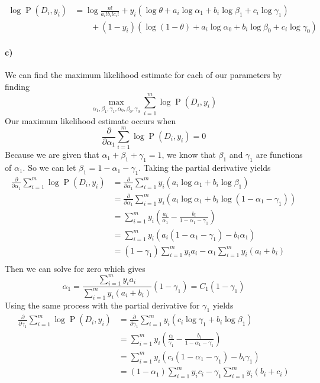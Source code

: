 \documentclass[12pt]{article}
\begin{document}
\begin{align*}
        \log \operatorname{P}(D_i, y_i) &= \log \frac{n!}{a_i!b_i!c_i!} + y_i(\log \theta +a_i\log\alpha_1+b_i\log\beta_1+c_i\log\gamma_1)\\
        &\qquad+(1-y_i)(\log(1-\theta)+a_i\log\alpha_0+b_i\log\beta_0+c_i\log\gamma_0)
\end{align*}

\paragraph{c)}

We can find the maximum likelihood estimate for each of our parameters by finding
\[\max_{\alpha_1,\beta_1,\gamma_1,\alpha_0,\beta_0,\gamma_0}\sum_{i=1}^m\log \operatorname{P}(D_i, y_i)\]
Our maximum likelihood estimate occurs when
\[\frac{\partial}{\partial \alpha_1}\sum_{i=1}^m\log \operatorname{P}(D_i, y_i)=0\]
Because we are given that \(\alpha_1+\beta_1+\gamma_1=1\), we know that \(\beta_1\) and \(\gamma_1\) are functions of \(\alpha_1\). So we can let
\(\beta_1=1-\alpha_1-\gamma_1\). Taking the partial derivative yields
\begin{align*}
        \frac{\partial}{\partial \alpha_1}\sum_{i=1}^m\log \operatorname{P}(D_i, y_i)&=\frac{\partial}{\partial \alpha_1}\sum_{i=1}^m y_i(a_i\log\alpha_1+b_i\log\beta_1)\\
        &=\frac{\partial}{\partial \alpha_1}\sum_{i=1}^m y_i(a_i\log\alpha_1+b_i\log(1-\alpha_1-\gamma_1))\\
        &=\sum_{i=1}^my_i\left(\frac{a_i}{\alpha_1}-\frac{b_i}{1-\alpha_1-\gamma_1}\right)\\
        &=\sum_{i=1}^my_i(a_i(1-\alpha_1-\gamma_1)-b_i\alpha_1)\\
        &=(1-\gamma_1)\sum_{i=1}^m y_ia_i-\alpha_1\sum_{i=1}^m y_i(a_i+b_i)\\
\end{align*}
Then we can solve for zero which gives
\[\alpha_1=\frac{\sum_{i=1}^m y_ia_i}{\sum_{i=1}^m y_i(a_i+b_i)}(1-\gamma_1)=C_1(1-\gamma_1)\]
Using the same process with the partial derivative for \(\gamma_1\) yields
\begin{align*}
        \frac{\partial}{\partial \gamma_1}\sum_{i=1}^m\log \operatorname{P}(D_i, y_i)&=\frac{\partial}{\partial \gamma_1}\sum_{i=1}^m y_i(c_i\log\gamma_1+b_i\log\beta_1)\\
        &=\sum_{i=1}^my_i\left(\frac{c_i}{\gamma_1}-\frac{b_i}{1-\alpha_1-\gamma_1}\right)\\
        &=\sum_{i=1}^my_i(c_i(1-\alpha_1-\gamma_1)-b_i\gamma_1)\\
        &=(1-\alpha_1)\sum_{i=1}^m y_ic_i-\gamma_1\sum_{i=1}^m y_i(b_i+c_i)\\
\end{align*}
\end{document}
